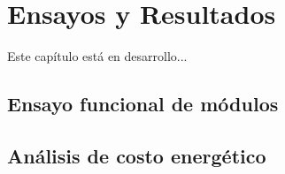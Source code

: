 
\chapter{Ensayos y Resultados} %

\label{Chapter4} %

Este capítulo está en desarrollo...


%
%

\section{Ensayo funcional de módulos}
\label{sec:funcional}


\section{Análisis de costo energético}
\label{sec:Análisis de costo}

